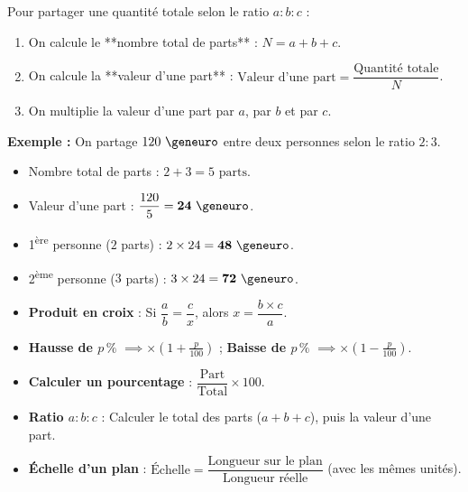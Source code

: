 \begin{cadremethode}
Pour partager une quantité totale selon le ratio $a : b : c$ :
\begin{enumerate}
    \item On calcule le **nombre total de parts** : $N = a + b + c$.
    \item On calcule la **valeur d'une part** : $\text{Valeur d'une part} = \dfrac{\text{Quantité totale}}{N}$.
    \item On multiplie la valeur d'une part par $a$, par $b$ et par $c$.
\end{enumerate}

\textbf{Exemple :} On partage $120\text{ \euro{}}$ entre deux personnes selon le ratio $2 : 3$.
\begin{itemize}
    \item Nombre total de parts : $2 + 3 = 5\text{ parts}$.
    \item Valeur d'une part : $\dfrac{120}{5} = \mathbf{24\text{ \euro{}}}$.
    \item 1\textsuperscript{ère} personne ($2$ parts) : $2 \times 24 = \mathbf{48\text{ \euro{}}}$.
    \item 2\textsuperscript{ème} personne ($3$ parts) : $3 \times 24 = \mathbf{72\text{ \euro{}}}$.
\end{itemize}
\end{cadremethode}

\begin{cadreretenu}
\begin{itemize}
    \item \textbf{Produit en croix} : Si $\dfrac{a}{b} = \dfrac{c}{x}$, alors $x = \dfrac{b \times c}{a}$.
    \item \textbf{Hausse de $p\,\%$} $\implies \times (1 + \frac{p}{100})$ \quad ; \quad \textbf{Baisse de $p\,\%$} $\implies \times (1 - \frac{p}{100})$.
    \item \textbf{Calculer un pourcentage} : $\dfrac{\text{Part}}{\text{Total}} \times 100$.
    \item \textbf{Ratio $a:b:c$} : Calculer le total des parts ($a+b+c$), puis la valeur d'une part.
    \item \textbf{Échelle d'un plan} : $\text{Échelle} = \dfrac{\text{Longueur sur le plan}}{\text{Longueur réelle}}$ (avec les mêmes unités).
\end{itemize}
\end{cadreretenu}

